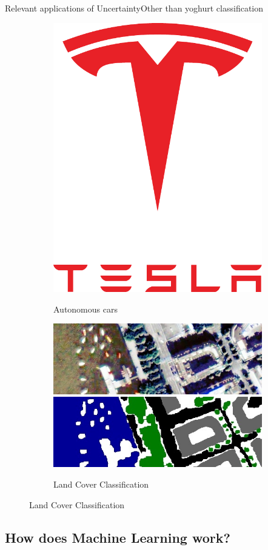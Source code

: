 \documentclass{beamer}
\begin{document}
\begin{frame}{Relevant applications of Uncertainty}{Other than yoghurt classification}
\begin{figure}[H]
\begin{subfigure}{0.26\textwidth}
		\includegraphics[width=.3\textwidth]{Tesla_Motors}\\
		\caption{Autonomous cars}
	\end{subfigure}
	\pause
	\begin{subfigure}{0.38\textwidth}
		\centering
		\includegraphics[width=\textwidth]{Im_11_detail.jpg}
		\includegraphics[width=\textwidth]{GT_11_detail.jpg}
		\caption{Land Cover Classification}
	\end{subfigure}
\end{figure}
\end{frame}

\subsection{How does Machine Learning work?}
\end{document}
